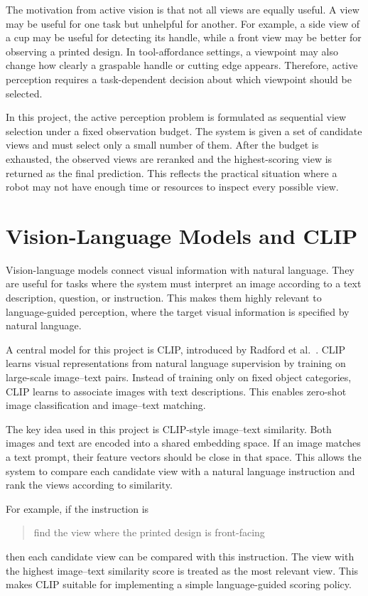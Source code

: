 The motivation from active vision is that not all views are equally useful. A view may be useful for one task but unhelpful for another. For example, a side view of a cup may be useful for detecting its handle, while a front view may be better for observing a printed design. In tool-affordance settings, a viewpoint may also change how clearly a graspable handle or cutting edge appears. Therefore, active perception requires a task-dependent decision about which viewpoint should be selected.

In this project, the active perception problem is formulated as sequential view selection under a fixed observation budget. The system is given a set of candidate views and must select only a small number of them. After the budget is exhausted, the observed views are reranked and the highest-scoring view is returned as the final prediction. This reflects the practical situation where a robot may not have enough time or resources to inspect every possible view.

\section{Vision-Language Models and CLIP}

Vision-language models connect visual information with natural language. They are useful for tasks where the system must interpret an image according to a text description, question, or instruction. This makes them highly relevant to language-guided perception, where the target visual information is specified by natural language.

A central model for this project is CLIP, introduced by Radford et al.~\cite{radford_learning_2021}. CLIP learns visual representations from natural language supervision by training on large-scale image--text pairs. Instead of training only on fixed object categories, CLIP learns to associate images with text descriptions. This enables zero-shot image classification and image--text matching.

The key idea used in this project is CLIP-style image--text similarity. Both images and text are encoded into a shared embedding space. If an image matches a text prompt, their feature vectors should be close in that space. This allows the system to compare each candidate view with a natural language instruction and rank the views according to similarity.

For example, if the instruction is
\begin{quote}
find the view where the printed design is front-facing
\end{quote}
then each candidate view can be compared with this instruction. The view with the highest image--text similarity score is treated as the most relevant view. This makes CLIP suitable for implementing a simple language-guided scoring policy.

